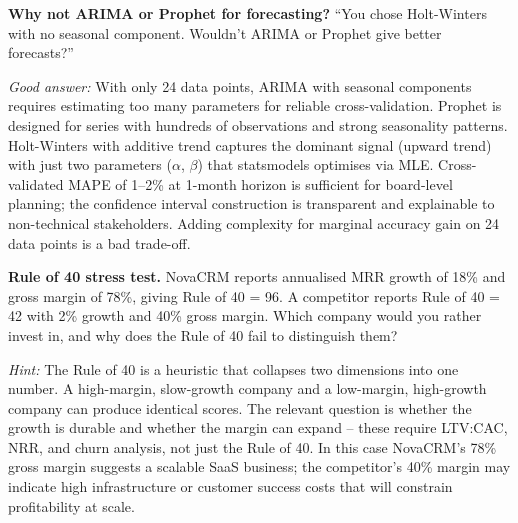 \begin{interviewbox}
\textbf{Why not ARIMA or Prophet for forecasting?} ``You chose Holt-Winters with no seasonal component. Wouldn't ARIMA or Prophet give better forecasts?''

\smallskip
\textit{Good answer:} With only 24 data points, ARIMA with seasonal components requires estimating too many parameters for reliable cross-validation. Prophet is designed for series with hundreds of observations and strong seasonality patterns. Holt-Winters with additive trend captures the dominant signal (upward trend) with just two parameters ($\alpha$, $\beta$) that statsmodels optimises via MLE. Cross-validated MAPE of 1--2\% at 1-month horizon is sufficient for board-level planning; the confidence interval construction is transparent and explainable to non-technical stakeholders. Adding complexity for marginal accuracy gain on 24 data points is a bad trade-off.
\end{interviewbox}

\begin{challengebox}
\textbf{Rule of 40 stress test.} NovaCRM reports annualised MRR growth of 18\% and gross margin of 78\%, giving Rule of 40 = 96. A competitor reports Rule of 40 = 42 with 2\% growth and 40\% gross margin. Which company would you rather invest in, and why does the Rule of 40 fail to distinguish them?

\smallskip
\textit{Hint:} The Rule of 40 is a heuristic that collapses two dimensions into one number. A high-margin, slow-growth company and a low-margin, high-growth company can produce identical scores. The relevant question is whether the growth is durable and whether the margin can expand -- these require LTV:CAC, NRR, and churn analysis, not just the Rule of 40. In this case NovaCRM's 78\% gross margin suggests a scalable SaaS business; the competitor's 40\% margin may indicate high infrastructure or customer success costs that will constrain profitability at scale.
\end{challengebox}


